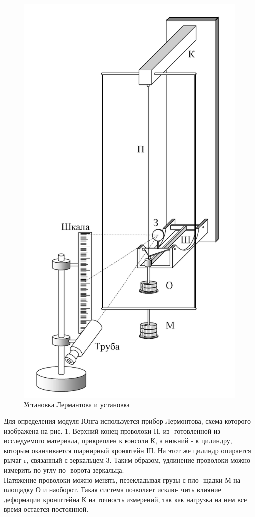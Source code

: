 \documentclass[a4paper,12pt]{article} %
\begin{document}
\begin{figure}[!h]
    \centering
    \includegraphics[height=0.35\textheight]{pictures/lermantov.png}
    \caption{Установка Лермантова и установка}
\end{figure}

Для определения модуля Юнга используется прибор Лермонтова,
схема которого изображена на рис. 1. Верхний конец проволоки П, из-
готовленной из исследуемого материала, прикреплен к консоли К, а
нижний - к цилиндру, которым оканчивается шарнирный кронштейн
Ш. На этот же цилиндр опирается рычаг r, связанный с зеркальцем
3. Таким образом, удлинение проволоки можно измерить по углу по-
ворота зеркальца.\\
Натяжение проволоки можно менять, перекладывая грузы с пло-
щадки М на площадку О и наоборот. Такая система позволяет исклю-
чить влияние деформации кронштейна К на точность измерений, так
как нагрузка на нем все время остается постоянной.
\end{document}
